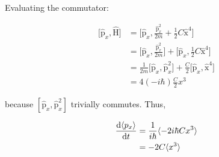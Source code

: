Evaluating the commutator:

\begin{align*}
  \big[ \hat{\textrm{p}}_x, \hat{\textrm{H}} \big] &= \big[ \hat{\textrm{p}}_x, \frac{\hat{\textrm{p}}_{x}^2}{2m} + \frac{1}{2} C \hat{\textrm{x}}^4 \big] \\
    &= \big[ \hat{\textrm{p}}_x, \frac{\hat{\textrm{p}}_{x}^2}{2m} \big] + \big[ \hat{\textrm{p}}_x, \frac{1}{2} C \hat{\textrm{x}}^4 \big] \\
    &= \frac{1}{2m} \big[ \hat{\textrm{p}}_x, \hat{\textrm{p}}_{x}^2 \big] + \frac{C}{2} \big[ \hat{\textrm{p}}_x, \hat{\textrm{x}}^4 \big] \\
    &= 4 (-i\hbar) \frac{C}{2} x^3
\end{align*}

because $[\hat{\textrm{p}}_x, \hat{\textrm{p}}_{x}^2]$ trivially commutes. Thus,

\begin{align*}
  \frac{\dif{\langle p_x \rangle}}{\dif{t}} &= \frac{1}{i\hbar} \langle -2 i\hbar C x^3 \rangle \\
    &= -2 C \langle x^3 \rangle
\end{align*}
